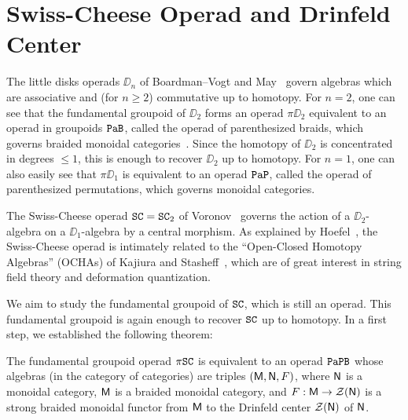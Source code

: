 
\chapter{Swiss-Cheese Operad and Drinfeld Center}
\label{chap.1}

The little disks operads $\DD_{n}$ of Boardman--Vogt and May~\cite{BoardmanVogt1973,May1972} govern algebras which are associative and (for $n \geq 2$) commutative up to homotopy.
For $n=2$, one can see that the fundamental groupoid of $\DD_{2}$ forms an operad $\pi \DD_{2}$ equivalent to an operad in groupoids $\mathtt{PaB}$, called the operad of parenthesized braids, which governs braided monoidal categories~\cite[§I.6]{Fresse2017}.
Since the homotopy of $\DD_{2}$ is concentrated in degrees $\leq 1$, this is enough to recover $\DD_{2}$ up to homotopy.
For $n=1$, one can also easily see that $\pi\DD_{1}$ is equivalent to an operad $\mathtt{PaP}$, called the operad of parenthesized permutations, which governs monoidal categories.

The Swiss-Cheese operad $\mathtt{SC} = \mathtt{SC}_{2}$ of Voronov~\cite{Voronov1999} governs the action of a $\DD_{2}$-algebra on a $\DD_{1}$-algebra by a central morphism.
As explained by Hoefel~\cite{Hoefel2009}, the Swiss-Cheese operad is intimately related to the ``Open-Closed Homotopy Algebras'' (OCHAs) of Kajiura and Stasheff~\cite{KajiuraStasheff2006}, which are of great interest in string field theory and deformation quantization.

We aim to study the fundamental groupoid of $\mathtt{SC}$, which is still an operad.
This fundamental groupoid is again enough to recover $\mathtt{SC}$ up to homotopy.
In a first step, we established the following theorem:

\begin{theoremintro}
  \label{sw.thm.A}
  The fundamental groupoid operad $\pi \mathtt{SC}$ is equivalent to an operad $\mathtt{PaPB}$ whose algebras (in the category of categories) are triples $(\mathsf{M}, \mathsf{N}, F)$, where $\mathsf{N}$ is a monoidal category, $\mathsf{M}$ is a braided monoidal category, and $F : \mathsf{M} \to \mathcal{Z}(\mathsf{N})$ is a strong braided monoidal functor from $\mathsf{M}$ to the Drinfeld center $\mathcal{Z}(\mathsf{N})$ of $\mathsf{N}$.
\end{theoremintro}

